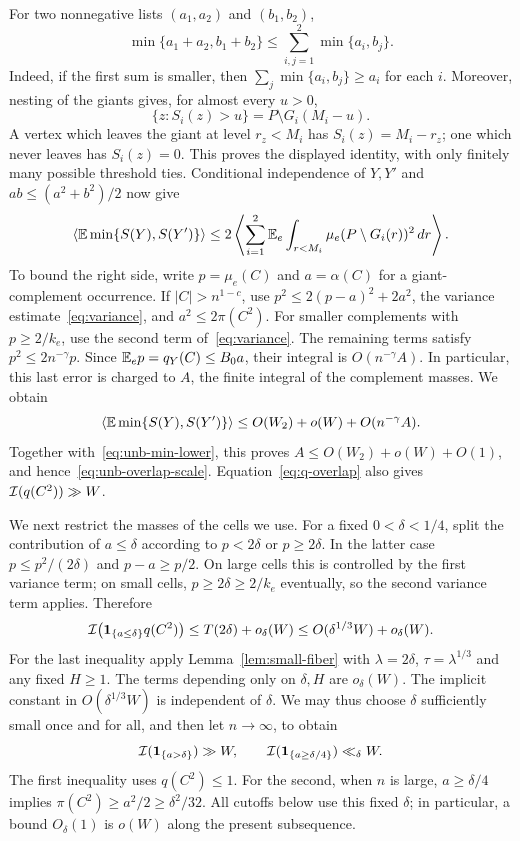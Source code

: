 For two nonnegative lists $(a_1,a_2)$ and $(b_1,b_2)$,
\[
 \min\{a_1+a_2,b_1+b_2\}\le\sum_{i,j=1}^2\min\{a_i,b_j\}.
\]
Indeed, if the first sum is smaller, then
$\sum_j\min\{a_i,b_j\}\ge a_i$ for each $i$. Moreover, nesting of the
giants gives, for almost every $u>0$,
\[
 \{z:S_i(z)>u\}=P\setminus G_i(M_i-u).
\]
A vertex which leaves the giant at level $r_z<M_i$ has
$S_i(z)=M_i-r_z$; one which never leaves has $S_i(z)=0$. This proves
the displayed identity, with only finitely many possible threshold ties.
Conditional independence of $Y,Y'$ and $ab\le(a^2+b^2)/2$ now give
\begin{equation}\label{eq:unb-min-upper}
 \left\langle \mathbb E\min\{S(Y),S(Y')\}\right\rangle
 \le 2\left\langle \sum_{i=1}^2\mathbb E_e\int_{r<M_i}
          \mu_e(P\setminus G_i(r))^2\,dr\right\rangle.
\end{equation}
To bound the right side, write $p=\mu_e(C)$ and $a=\alpha(C)$ for a
giant-complement occurrence. If $|C|>n^{1-c}$, use
$p^2\le2(p-a)^2+2a^2$, the variance estimate~\eqref{eq:variance}, and
$a^2\le2\pi(C^2)$. For smaller complements with $p\ge2/k_e$, use
the second term of~\eqref{eq:variance}. The remaining terms satisfy
$p^2\le2n^{-\gamma}p$. Since $\mathbb E_e p=q_Y(C)\le B_0a$, their integral
is $O(n^{-\gamma}A)$. In particular, this last error is charged to
$A$, the finite integral of the complement masses. We obtain
\[
 \left\langle \mathbb E\min\{S(Y),S(Y')\}\right\rangle
 \le O(W_2)+o(W)+O(n^{-\gamma}A).
\]
Together with~\eqref{eq:unb-min-lower}, this proves
$A\le O(W_2)+o(W)+O(1)$, and hence~\eqref{eq:unb-overlap-scale}.
Equation~\eqref{eq:q-overlap} also gives $\mathcal I(q(C^2))\gg W$.

We next restrict the masses of the cells we use. For a fixed
$0<\delta<1/4$, split the contribution of $a\le\delta$ according to
$p<2\delta$ or $p\ge2\delta$. In the latter case
$p\le p^2/(2\delta)$ and $p-a\ge p/2$. On large cells this is
controlled by the first variance term; on small cells,
$p\ge2\delta\ge2/k_e$ eventually, so the second variance term applies.
Therefore
\[
 \mathcal I\bigl(\mathbf 1_{\{a\le\delta\}}q(C^2)\bigr)
 \le T(2\delta)+o_\delta(W)
 \le O(\delta^{1/3}W)+o_\delta(W).
\]
For the last inequality apply Lemma~\ref{lem:small-fiber} with
$\lambda=2\delta$, $\tau=\lambda^{1/3}$ and any fixed $H\ge1$.
The terms depending only on $\delta,H$ are $o_\delta(W)$.
The implicit constant in $O(\delta^{1/3}W)$ is independent of $\delta$.
We may thus choose $\delta$ sufficiently small once and for all, and
then let $n\to\infty$, to obtain
\begin{equation}\label{eq:cut-mass}
 \mathcal I(\mathbf 1_{\{a>\delta\}})\gg W,
 \qquad
 \mathcal I(\mathbf 1_{\{a\ge\delta/4\}})\ll_\delta W.
\end{equation}
The first inequality uses $q(C^2)\le1$. For the second, when $n$ is
large, $a\ge\delta/4$ implies
$\pi(C^2)\ge a^2/2\ge\delta^2/32$.
All cutoffs below use this fixed $\delta$; in particular, a bound
$O_\delta(1)$ is $o(W)$ along the present subsequence.


